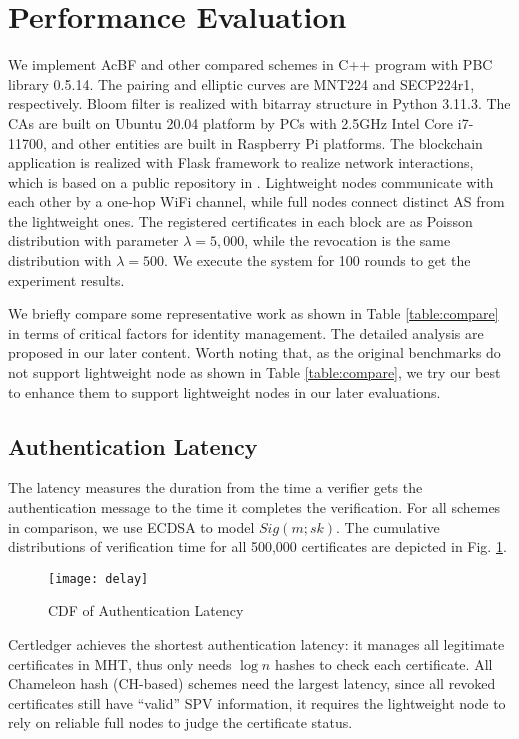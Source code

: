 \documentclass[conference]{IEEEtran}
\begin{document}
\section{Performance Evaluation} \label{sec:efficiency}
We implement AcBF and other compared schemes in C++ program with PBC library 0.5.14. The pairing and elliptic curves are MNT224 and SECP224r1, respectively. Bloom filter is realized with bitarray structure in Python 3.11.3. The CAs are built on Ubuntu 20.04 platform by PCs with 2.5GHz Intel Core i7-11700, and other entities are built in Raspberry Pi platforms. The blockchain application is realized with Flask framework to realize network interactions, which is based on a public repository in \cite{implement}. 
Lightweight nodes communicate with each other by a one-hop WiFi channel, while full nodes connect distinct AS from the lightweight ones. The registered certificates in each block are as Poisson distribution with parameter $\lambda = 5, 000$, while the revocation is the same distribution with $\lambda = 500$. We execute the system for 100 rounds to get the experiment results.

We briefly compare some representative work as shown in Table \ref{table:compare} in terms of critical factors for identity management. The detailed analysis are proposed in our later content. %
Worth noting that, as the original benchmarks do not support lightweight node as shown in Table \ref{table:compare}, we try our best to enhance them to support lightweight nodes in our later evaluations. 

\subsection{Authentication Latency}\label{sec:authentication latency}

The latency measures the duration from the time a verifier gets the authentication message to the time it completes the verification. For all schemes in comparison, we use ECDSA to model $Sig(m; sk)$. The cumulative distributions of verification time for all 500,000 certificates are depicted in Fig. \ref{fig:cdf}. 

\begin{figure}[t]
	\centering
	\texttt{[image: delay]}
	\caption{CDF of Authentication Latency}
	\label{fig:cdf}
\end{figure}

Certledger \cite{certledger} achieves the shortest authentication latency: it manages all legitimate certificates in MHT, thus only needs $\log n$ hashes to check each certificate. All Chameleon hash (CH-based) schemes \cite{luoScalaCertScalabilityOrientedPKI2022a,jia2021process} need the largest latency, since all revoked certificates still have ``valid'' SPV information, it requires the lightweight node to rely on reliable full nodes to judge the certificate status. 
\end{document}
